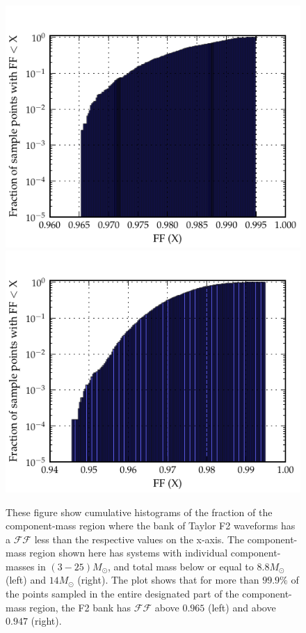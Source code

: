 \documentclass[aps,
prd,
amsmath,
amssymb,
twocolumn,
floatfix,
groupedaddress]{revtex4-1}
\begin{document}
\begin{figure}
\centerline{
\includegraphics[scale=0.04, clip=false,keepaspectratio=true, width=\columnwidth]{F2EOBhist.pdf}
\includegraphics[scale=0.04, clip=false, keepaspectratio=true, width=\columnwidth]{F2EOBhist15pc.pdf}
}
\caption{\label{fig:cumhist_f2eob_cut14}These figure show cumulative histograms of the fraction of the component-mass region where the bank of Taylor F2 waveforms has a $\mathcal{FF}$ less than the respective values on the x-axis. The component-mass region shown here has systems with individual component-masses in $(3-25)M_{\odot}$, and total mass below or equal to $8.8M_{\odot}$ (left) and $14M_{\odot}$ (right). The plot shows that for more than $99.9\%$ of the points sampled in the entire designated part of the component-mass region, the F2 bank has $\mathcal{FF}$ above $0.965$ (left) and above $0.947$ (right).}
\end{figure}
\end{document}
